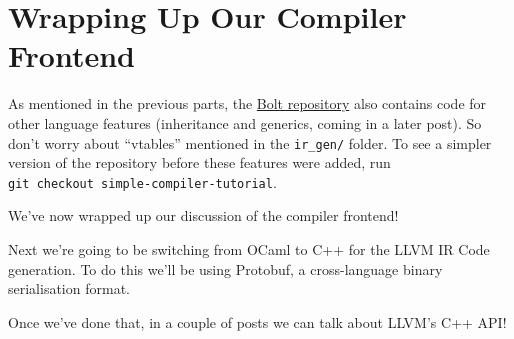 \hypertarget{wrapping-up-our-compiler-frontend}{%
\section{\texorpdfstring{\protect\hyperlink{wrapping-up-our-compiler-frontend}{}Wrapping
Up Our Compiler
Frontend}{Wrapping Up Our Compiler Frontend}}\label{wrapping-up-our-compiler-frontend}}

As mentioned in the previous parts, the
\href{https://github.com/mukul-rathi/bolt}{Bolt repository} also
contains code for other language features (inheritance and generics,
coming in a later post). So don't worry about ``vtables'' mentioned in
the \texttt{ir\_gen/} folder. To see a simpler version of the repository
before these features were added, run
\texttt{git\ checkout\ simple-compiler-tutorial}.

We've now wrapped up our discussion of the compiler frontend!

Next we're going to be switching from OCaml to C++ for the LLVM IR Code
generation. To do this we'll be using Protobuf, a cross-language binary
serialisation format.

Once we've done that, in a couple of posts we can talk about LLVM's C++
API!

